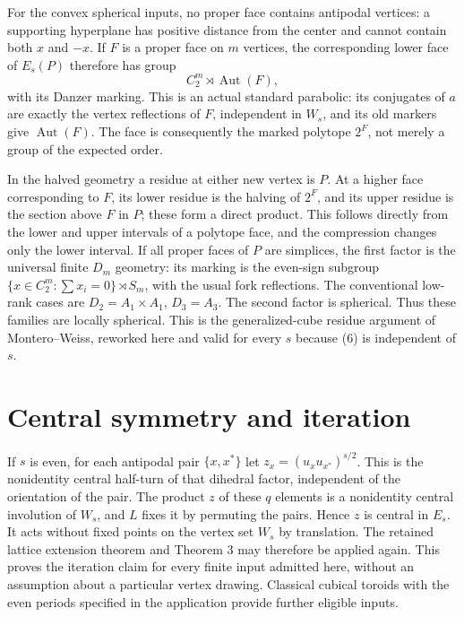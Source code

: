 For the convex spherical inputs, no proper face contains antipodal vertices: a supporting hyperplane has positive distance from the center and cannot contain both \(x\) and \(-x\). If \(F\) is a proper face on \(m\) vertices, the corresponding lower face of \(E_s(P)\) therefore has group
\[
 C_2^m\rtimes\operatorname{Aut}(F),            \tag{6}
\]
with its Danzer marking. This is an actual standard parabolic: its conjugates of \(a\) are exactly the vertex reflections of \(F\), independent in \(W_s\), and its old markers give \(\operatorname{Aut}(F)\). The face is consequently the marked polytope \(2^F\), not merely a group of the expected order.

In the halved geometry a residue at either new vertex is \(P\). At a higher face corresponding to \(F\), its lower residue is the halving of \(2^F\), and its upper residue is the section above \(F\) in \(P\); these form a direct product. This follows directly from the lower and upper intervals of a polytope face, and the compression changes only the lower interval. If all proper faces of \(P\) are simplices, the first factor is the universal finite \(D_m\) geometry: its marking is the even-sign subgroup \(\{x\in C_2^m:\sum x_i=0\}\rtimes S_m\), with the usual fork reflections. The conventional low-rank cases are \(D_2=A_1\times A_1\), \(D_3=A_3\). The second factor is spherical. Thus these families are locally spherical. This is the generalized-cube residue argument of Montero--Weiss, reworked here and valid for every \(s\) because (6) is independent of \(s\).

\section{Central symmetry and iteration}\label{central-symmetry-and-iteration}

If \(s\) is even, for each antipodal pair \(\{x,x^*\}\) let \(z_x=(u_xu_{x^*})^{s/2}\). This is the nonidentity central half-turn of that dihedral factor, independent of the orientation of the pair. The product \(z\) of these \(q\) elements is a nonidentity central involution of \(W_s\), and \(L\) fixes it by permuting the pairs. Hence \(z\) is central in \(E_s\). It acts without fixed points on the vertex set \(W_s\) by translation. The retained lattice extension theorem and Theorem 3 may therefore be applied again. This proves the iteration claim for every finite input admitted here, without an assumption about a particular vertex drawing. Classical cubical toroids with the even periods specified in the application provide further eligible inputs.

